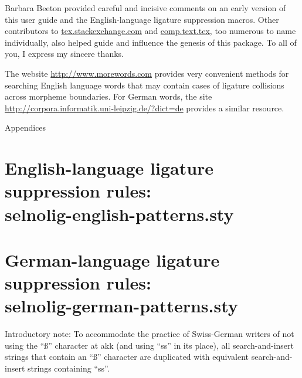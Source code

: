 \documentclass[11pt]{article}
\newcommand{\pkg}[1]{\textsf{#1}}
\let\oldappendix\appendix
\renewcommand\appendix{%
   \addtocontents{toc}{\protect{\vspace{1\baselineskip}}}
   \addtocontents{toc}{\protect{\mdseries Appendices\par}}
   \noindent
   {\Large Appendices}
   \oldappendix}
\begin{document}
Barbara Beeton provided careful and incisive comments on an early version of this user guide and the English-language ligature suppression macros. Other contributors to \url{tex.stackexchange.com} and \url{comp.text.tex}, too numerous to name individually, also helped guide and influence the genesis of this package. To all of you, I express my sincere thanks.

The website \url{http://www.morewords.com} provides very convenient methods for searching English language words that may contain cases of ligature collisions across morpheme boundaries. For German words, the site \url{http://corpora.informatik.uni-leipzig.de/?dict=de} provides a similar resource. 



\clearpage
\appendix
\selnoligoff  %


\small %


\section[English-language ligature suppression rules: selnolig-english-patterns.sty]{English-language ligature suppression rules: \\ 
\pkg{selnolig-english-patterns.sty}}
\label{sec:eng-listing}

\begin{multicols}{2}
\end{multicols}

\clearpage
\section[German-language ligature suppression rules:
selnolig-german-patterns.sty]{German-language ligature suppression rules: \\ 
\pkg{selnolig-german-patterns.sty}}
\label{sec:germ-listing}

Introductory note: To accommodate the practice of Swiss-German writers of not using the \enquote{ß} character at akk (and using \enquote{ss} in its place), all search-and-insert strings that contain an \enquote{ß} character are duplicated with equivalent search-and-insert strings containing \enquote{ss}.

\bigskip

\begin{multicols}{2}
\end{multicols}
\end{document}

